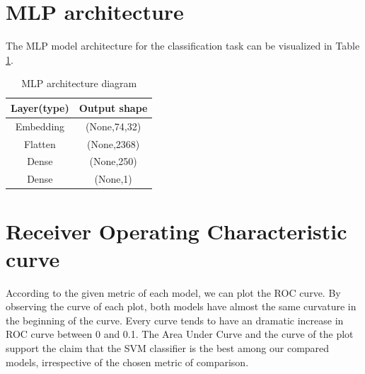 \section{MLP architecture}
The MLP model architecture for the classification task can be visualized in Table \ref{tab:mlp_str}.
\begin{table}[!h]
    \centering
    \begin{tabular}{|c|c|}
    \hline
    Layer(type)&Output shape  \\
    \hline\hline
    Embedding&(None,74,32)\\
    \hline
    Flatten&(None,2368)\\
    \hline
    Dense&(None,250)\\
    \hline
    Dense&(None,1)\\
    \hline
    \end{tabular}
    \caption{MLP architecture diagram}
    \label{tab:mlp_str}
\end{table}

\section{Receiver Operating Characteristic curve}
According to the given metric of each model, we can plot the ROC curve. By observing the curve of each plot, both models have almost the same curvature in the beginning of the curve. Every curve tends to have an dramatic increase in ROC curve between 0 and 0.1. The Area Under Curve and the curve of the plot 
support the claim that the SVM classifier is the best among our compared models, irrespective of the chosen metric of comparison.

